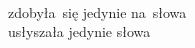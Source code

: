 \documentclass[a4paper,11pt]{article}
\numberwithin{equation}{section}
\begin{document}
\noindent
{} \\
\Jest zdobyła~się jedynie na~słowa \\
\PowinnoByc usłyszała jedynie słowa \\







































\printbibliography






\end{document}
